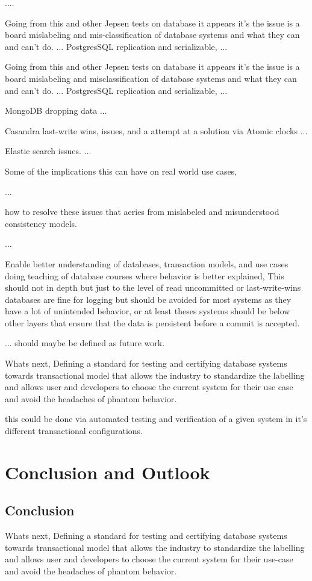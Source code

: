 \documentclass[a4paper,10pt,titlepage]{report}
\begin{document}
    ....

    Going from this and other Jepsen tests on database it appears it's the issue is a board mislabeling and mis-classification of database systems and what they can and can't do.
    ...
    PostgresSQL replication and serializable,
    ...

    Going from this and other Jepsen tests on database it appears it's the issue is a board mislabeling and misclassification of database systems and what they can and can't do.
    ...
    PostgresSQL replication and serializable,
    ...

    MongoDB dropping data
    ...

    Casandra last-write wins, issues, and a attempt at a solution via Atomic clocks
    ...

    Elastic search issues.
    ...

    Some of the implications this can have on real world use cases,

    ...

    how to resolve these issues that aeries from mislabeled and misunderstood consistency models.

    ...

    Enable better understanding of databases, transaction models, and use cases doing teaching of database courses where behavior is better explained, This should not in depth but just to the level of read uncommitted or last-write-wins databases are fine for logging but should be avoided for most systems as they have a lot of unintended behavior, or at least theses systems should be below other layers that ensure that the data is persistent before a commit is accepted.

    ... should maybe be defined as future work.

    Whats next, Defining a standard for testing and certifying database systems towards transactional model that allows the industry to standardize the labelling and allows user and developers to choose the current system for their use case and avoid the headaches of phantom behavior.

    this could be done via automated testing and verification of a given system in it's different transactional configurations.


    \chapter{Conclusion and Outlook}
    \section*{Conclusion}
Whats next, Defining a standard for testing and certifying database systems towards transactional model that allows the industry to standardize the labelling and allows user and developers to choose the current system for their use-case and avoid the headaches of phantom behavior.
\end{document}
